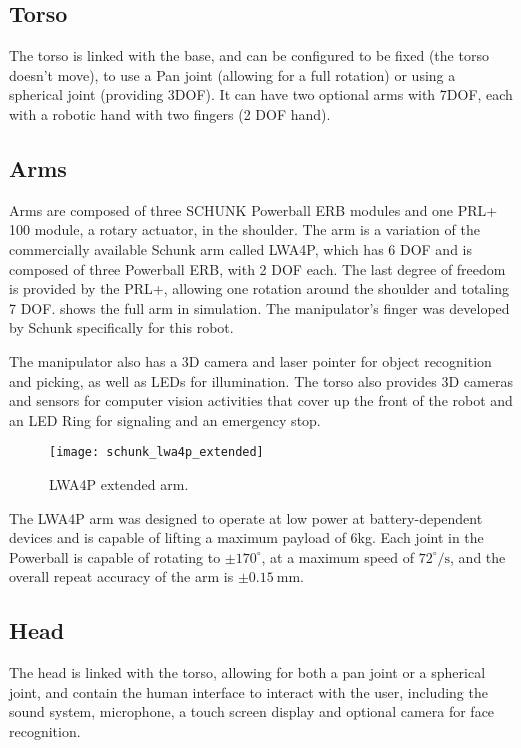 \subsection{Torso}

The torso is linked with the base, and can be configured to be fixed (the torso doesn't move), to use a Pan joint (allowing for a full rotation) or using a spherical joint (providing 3DOF). It can have two optional arms with 7DOF, each with a robotic hand with two fingers (2 DOF hand).

\subsection{Arms}

Arms are composed of three SCHUNK Powerball ERB modules and one PRL+ 100 module, a rotary actuator, in the shoulder. The arm is a variation of the commercially available Schunk arm called LWA4P, which has 6 DOF and is composed of three Powerball ERB, with 2 DOF each. The last degree of freedom is provided by the PRL+, allowing one rotation around the shoulder and totaling 7 DOF.  shows the full arm in simulation. The manipulator's finger was developed by Schunk specifically for this robot.

The manipulator also has a 3D camera and laser pointer for object recognition and picking, as well as LEDs for illumination. The torso also provides 3D cameras and sensors for computer vision activities that cover up the front of the robot and an LED Ring for signaling and an emergency stop.

\begin{figure}[!ht]
    \centering
    \texttt{[image: schunk\_lwa4p\_extended]}
    \caption{LWA4P extended arm.}
    \label{fig:schunk_lwa4p_extended}
\end{figure}

The LWA4P arm was designed to operate at low power at battery-dependent devices and is capable of lifting a maximum payload of 6kg. Each joint in the Powerball is capable of rotating to $\pm 170^\circ$, at a maximum speed of $72^\circ /\text{s}$, and the overall repeat accuracy of the arm is $\pm 0.15 \ \text{mm}$.


\subsection{Head}

The head is linked with the torso, allowing for both a pan joint or a spherical joint, and contain the human interface to interact with the user, including the sound system, microphone, a touch screen display and optional camera for face recognition.


